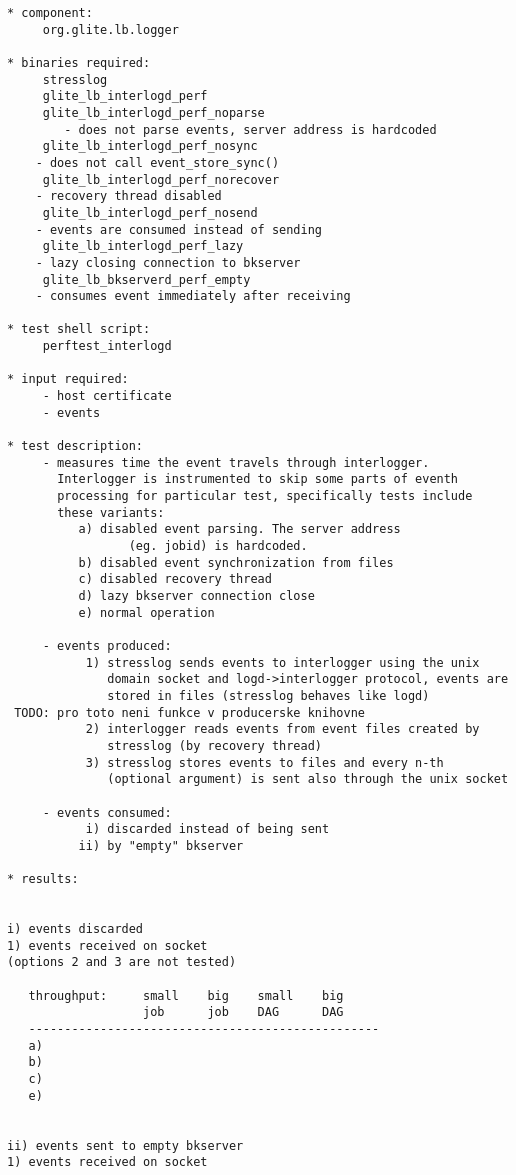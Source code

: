 \begin{verbatim}
* component:
     org.glite.lb.logger

* binaries required:
     stresslog
     glite_lb_interlogd_perf
     glite_lb_interlogd_perf_noparse
        - does not parse events, server address is hardcoded
     glite_lb_interlogd_perf_nosync
	- does not call event_store_sync()
     glite_lb_interlogd_perf_norecover
	- recovery thread disabled
     glite_lb_interlogd_perf_nosend
	- events are consumed instead of sending
     glite_lb_interlogd_perf_lazy
	- lazy closing connection to bkserver
     glite_lb_bkserverd_perf_empty
	- consumes event immediately after receiving

* test shell script:
     perftest_interlogd

* input required:
     - host certificate
     - events

* test description:
     - measures time the event travels through interlogger.
       Interlogger is instrumented to skip some parts of eventh
       processing for particular test, specifically tests include
       these variants: 
	      a) disabled event parsing. The server address
                 (eg. jobid) is hardcoded.
	      b) disabled event synchronization from files
	      c) disabled recovery thread
	      d) lazy bkserver connection close
	      e) normal operation

     - events produced:
           1) stresslog sends events to interlogger using the unix
              domain socket and logd->interlogger protocol, events are
              stored in files (stresslog behaves like logd)
 TODO: pro toto neni funkce v producerske knihovne
           2) interlogger reads events from event files created by
              stresslog (by recovery thread)
           3) stresslog stores events to files and every n-th
              (optional argument) is sent also through the unix socket

     - events consumed:
           i) discarded instead of being sent
          ii) by "empty" bkserver

* results:


i) events discarded
1) events received on socket
(options 2 and 3 are not tested)

   throughput:     small    big    small    big 
                   job      job    DAG      DAG 
   -------------------------------------------------
   a)
   b)
   c)
   e)


ii) events sent to empty bkserver 
1) events received on socket


\end{verbatim}
